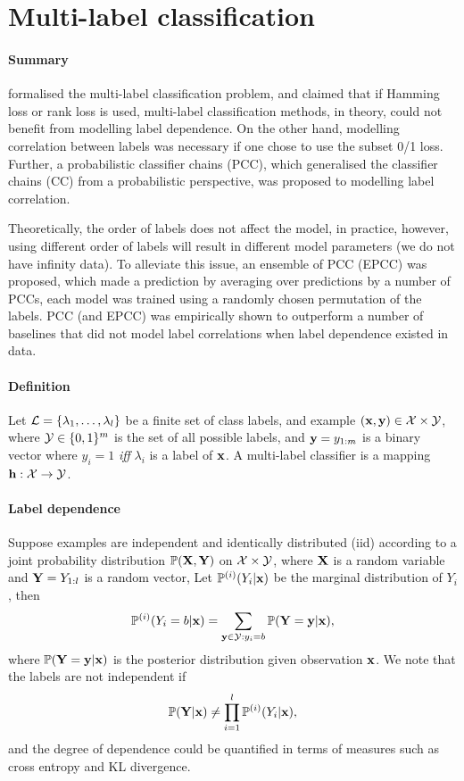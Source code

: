 \section{Multi-label classification}
\label{sec:mlc}

\paragraph{Summary}
\citet{dembczynski:2010} formalised the multi-label classification problem, 
and claimed that if Hamming loss or rank loss is used,
multi-label classification methods, in theory, could not benefit from modelling label dependence.
On the other hand, modelling correlation between labels was necessary if one chose to use the subset 0/1 loss.
Further, a probabilistic classifier chains (PCC), which generalised the classifier chains (CC) from a probabilistic perspective,
was proposed to modelling label correlation. 

Theoretically, the order of labels does not affect the model, 
in practice, however, using different order of labels will result in different model parameters (we do not have infinity data).
To alleviate this issue, an ensemble of PCC (EPCC) was proposed, which made a prediction by averaging over predictions by a number of PCCs, 
each model was trained using a randomly chosen permutation of the labels.
PCC (and EPCC) was empirically shown to outperform a number of baselines that did not model label correlations when label dependence existed in data.


\noindent
\paragraph{Definition}
Let $\mathcal{L} = \{\lambda_1,\dots,\lambda_l\}$ be a finite set of class labels,
and example $(\mathbf{x},\mathbf{y}) \in \mathcal{X} \times \mathcal{Y}$, 
where $\mathcal{Y} \in \{0,1\}^m$ is the set of all possible labels,
and $\mathbf{y}=y_{1:m}$ is a binary vector where $y_i = 1$ \emph{iff} $\lambda_i$ is a label of $\mathbf{x}$.
A multi-label classifier is a mapping $\mathbf{h}: \mathcal{X} \to \mathcal{Y}$.

\noindent
\paragraph{Label dependence}
Suppose examples are independent and identically distributed (iid) according to a joint probability distribution $\mathbb{P}(\mathbf{X},\mathbf{Y})$ on $\mathcal{X} \times \mathcal{Y}$,
where $\mathbf{X}$ is a random variable and $\mathbf{Y}=Y_{1:l}$ is a random vector,
Let $\mathbb{P}^{({i})}(Y_i |\mathbf{x})$ be the marginal distribution of $Y_i$, then
\begin{equation*}
\mathbb{P}^{({i})}(Y_i=b |\mathbf{x}) = \sum_{\mathbf{y} \in \mathcal{Y}:y_i = b} \mathbb{P}(\mathbf{Y} = \mathbf{y} |\mathbf{x}),
\end{equation*}
where $\mathbb{P}(\mathbf{Y} = \mathbf{y} |\mathbf{x})$ is the posterior distribution given observation $\mathbf{x}$.
We note that the labels are not independent if 
\begin{equation*}
\mathbb{P}(\mathbf{Y} |\mathbf{x}) \ne \prod_{i=1}^l \mathbb{P}^{({i})}(Y_i |\mathbf{x}),
\end{equation*}
and the degree of dependence could be quantified in terms of measures such as cross entropy and KL divergence.

